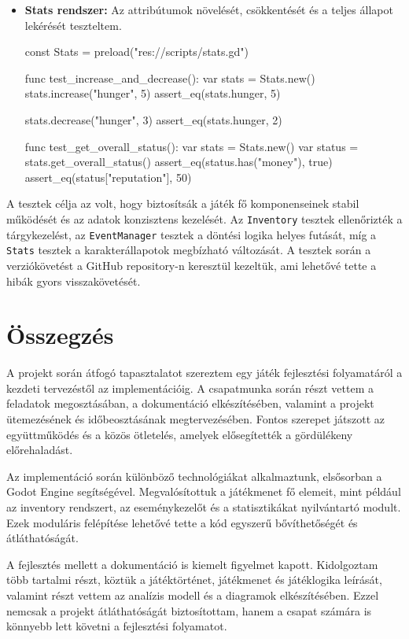 \documentclass[12pt,a4paper]{article}
\begin{document}
\begin{itemize}
    \item \textbf{Stats rendszer:} Az attribútumok növelését, csökkentését és a teljes állapot lekérését teszteltem.  
    \begin{python}
    const Stats = preload("res://scripts/stats.gd")

    func test_increase_and_decrease():
        var stats = Stats.new()
        stats.increase("hunger", 5)
        assert_eq(stats.hunger, 5)

        stats.decrease("hunger", 3)
        assert_eq(stats.hunger, 2)

    func test_get_overall_status():
        var stats = Stats.new()
        var status = stats.get_overall_status()
        assert_eq(status.has("money"), true)
        assert_eq(status["reputation"], 50)
    \end{python}
\end{itemize}

A tesztek célja az volt, hogy biztosítsák a játék fő komponenseinek stabil működését és az adatok konzisztens kezelését. Az \texttt{Inventory} tesztek ellenőrizték a tárgykezelést, az \texttt{EventManager} tesztek a döntési logika helyes futását, míg a \texttt{Stats} tesztek a karakterállapotok megbízható változását. A tesztek során a verziókövetést a GitHub repository-n keresztül kezeltük, ami lehetővé tette a hibák gyors visszakövetését.


\section{Összegzés}

A projekt során átfogó tapasztalatot szereztem egy játék fejlesztési folyamatáról a kezdeti tervezéstől az implementációig. A csapatmunka során részt vettem a feladatok megosztásában, a dokumentáció elkészítésében, valamint a projekt ütemezésének és időbeosztásának megtervezésében. Fontos szerepet játszott az együttműködés és a közös ötletelés, amelyek elősegítették a gördülékeny előrehaladást.

Az implementáció során különböző technológiákat alkalmaztunk, elsősorban a Godot Engine segítségével. Megvalósítottuk a játékmenet fő elemeit, mint például az inventory rendszert, az eseménykezelőt és a statisztikákat nyilvántartó modult. Ezek moduláris felépítése lehetővé tette a kód egyszerű bővíthetőségét és átláthatóságát.

A fejlesztés mellett a dokumentáció is kiemelt figyelmet kapott. Kidolgoztam több tartalmi részt, köztük a játéktörténet, játékmenet és játéklogika leírását, valamint részt vettem az analízis modell és a diagramok elkészítésében. Ezzel nemcsak a projekt átláthatóságát biztosítottam, hanem a csapat számára is könnyebb lett követni a fejlesztési folyamatot.
\end{document}
